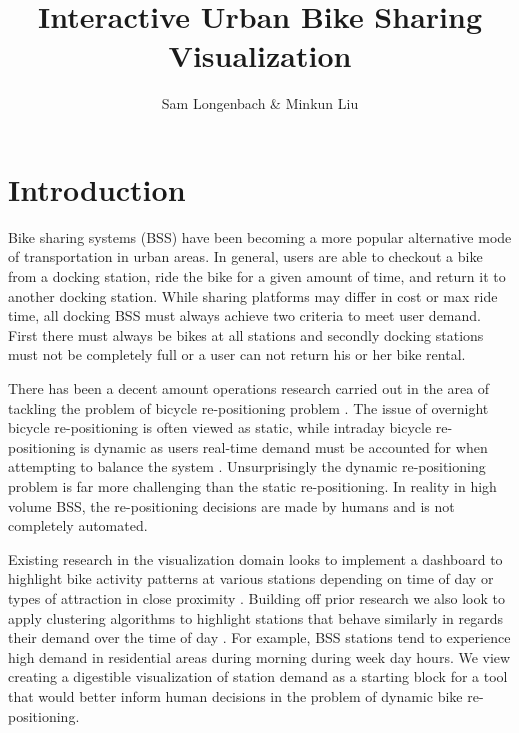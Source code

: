 \documentclass{proc}
\begin{document}
\title{Interactive Urban Bike Sharing Visualization}

\author{Sam Longenbach \& Minkun Liu}

\maketitle

\section{Introduction}
Bike sharing systems (BSS) have been becoming a more popular alternative mode of transportation in urban areas.  In general, users are able to checkout a bike from a docking station, ride the bike for a given amount of time, and return it to another docking station. While sharing platforms may differ in cost or max ride time, all docking BSS must always achieve two criteria to meet user demand. First there must always be bikes at all stations and secondly docking stations must not be completely full or a user can not return his or her bike rental. 
 
\noindent There has been a decent amount operations research carried out in the area of tackling the problem of bicycle re-positioning problem \cite{espegren2016static}. The issue of overnight bicycle re-positioning is often viewed as static, while intraday bicycle re-positioning is dynamic as users real-time demand must be accounted for when attempting to balance the system \cite{espegren2016static}. Unsurprisingly the dynamic re-positioning problem is far more challenging than the static re-positioning. In reality in high volume BSS, the re-positioning decisions are made by humans and is not completely automated.       
 
\noindent Existing research in the visualization domain looks to implement a dashboard to highlight bike activity patterns at various stations depending on time of day or types of attraction in close proximity \cite{yan2018visual}. Building off prior research we also look to apply clustering algorithms to highlight stations that behave similarly in regards their demand over the time of day \cite{vogel2011understanding}. For example, BSS stations tend to experience high demand in residential areas during morning during week day hours. We view creating a digestible visualization of station demand as a starting block for a tool that would better inform human decisions in the problem of dynamic bike re-positioning.
\end{document}
